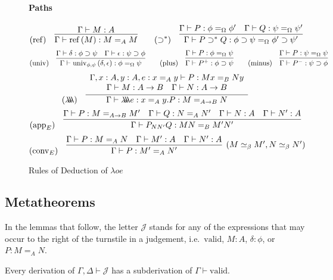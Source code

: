 \documentclass[a4paper,UKenglish]{lipics-v2016}
\newcommand*{\reff}[1]{\ensuremath{\mathrm{ref} \left( {#1} \right)}}
\newcommand*{\univ}[4]{\ensuremath{\mathrm{univ}_{{#1}, {#2}} \left({#3} , {#4} \right)}}
\newcommand*{\triplelambda}{\ensuremath{\lambda \!\! \lambda \!\! \lambda}}
\newcommand*{\vald}{\ensuremath{\vdash \mathrm{valid}}}
\theoremstyle{plain}
\begin{document}
\begin{figure}
\paragraph*{Paths}
\[ (\mathrm{ref}) \quad \infer{\Gamma \vdash \reff{M} : M =_A M}{\Gamma \vdash M : A}
\qquad
(\supset^*) \quad \infer{\Gamma \vdash P \supset^* Q : \phi \supset \psi =_\Omega \phi' \supset \psi'}{\Gamma \vdash P : \phi =_\Omega \phi' \quad \Gamma \vdash Q : \psi =_\Omega \psi'} \]
\[ (\mathrm{univ}) \quad \infer{\Gamma \vdash \univ{\phi}{\psi}{\delta}{\epsilon} : \phi =_\Omega \psi}{\Gamma \vdash \delta : \phi \supset \psi \quad \Gamma \vdash \epsilon : \psi \supset \phi} 
\qquad
(\mathrm{plus}) \quad \infer{\Gamma \vdash P^+ : \phi \supset \psi}{\Gamma \vdash P : \phi =_\Omega \psi}
\qquad
(\mathrm{minus}) \quad \infer{\Gamma \vdash P^- : \psi \supset \phi}{\Gamma \vdash P : \psi =_\Omega \psi} \]
\[ (\triplelambda) \quad \infer{\Gamma \vdash \triplelambda e : x =_A y . P : M =_{A \rightarrow B} N}
  {\begin{array}{c}
     \Gamma, x : A, y : A, e : x =_A y \vdash P : M x =_B N y \\
     \Gamma \vdash M : A \rightarrow B \quad
\Gamma \vdash N : A \rightarrow B
     \end{array}} \]
\[ (\mathrm{app}_E) \quad \infer{\Gamma \vdash P_{NN'}Q : MN =_B M' N'}{\Gamma \vdash P : M =_{A \rightarrow B} M' \quad \Gamma \vdash Q : N =_A N' \quad \Gamma \vdash N : A \quad \Gamma \vdash N' : A} \]
\[ (\mathrm{conv}_E) \quad \infer[(M \simeq_\beta M', N \simeq_\beta N')]{\Gamma \vdash P : M' =_A N'}{\Gamma \vdash P : M =_A N \quad \Gamma \vdash M' : A \quad \Gamma \vdash N' : A} \]
\caption{Rules of Deduction of $\lambda oe$}
\label{fig:lambdaoe}
\end{figure}

\subsection{Metatheorems}

\label{section:meta}

In the lemmas that follow, the letter $\mathcal{J}$ stands for any of the expressions that may occur to the right of the turnstile in a judgement, i.e.~$\mathrm{valid}$, $M : A$, $\delta : \phi$, or $P : M =_A N$.

\begin{lemma}
Every derivation of $\Gamma, \Delta \vdash \mathcal{J}$ has a subderivation of $\Gamma \vald$.
\end{lemma}
\end{document}
